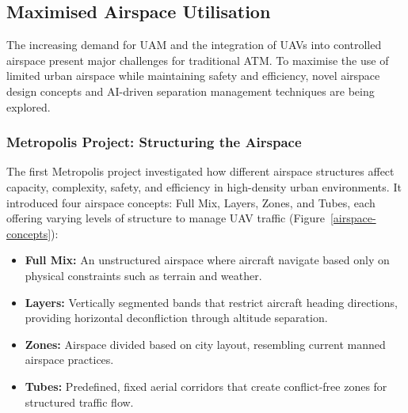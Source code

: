 \subsection{Maximised Airspace Utilisation}


The increasing demand for \gls{UAM} and the integration of \glspl{UAV} into controlled airspace present major challenges for traditional \gls{ATM}. 
To maximise the use of limited urban airspace while maintaining safety and efficiency, novel airspace design concepts and AI-driven separation management techniques are being explored.

\subsubsection{Metropolis Project: Structuring the Airspace}

The first Metropolis project investigated how different airspace structures affect capacity, complexity, safety, and efficiency in high-density urban environments. 
It introduced four airspace concepts: Full Mix, Layers, Zones, and Tubes, each offering varying levels of structure to manage \gls{UAV} traffic (Figure~\ref{airspace-concepts}):

\begin{itemize}
    \item \textbf{Full Mix:} An unstructured airspace where aircraft navigate based only on physical constraints such as terrain and weather.
    \item \textbf{Layers:} Vertically segmented bands that restrict aircraft heading directions, providing horizontal deconfliction through altitude separation.
    \item \textbf{Zones:} Airspace divided based on city layout, resembling current manned airspace practices.
    \item \textbf{Tubes:} Predefined, fixed aerial corridors that create conflict-free zones for structured traffic flow.
\end{itemize}

